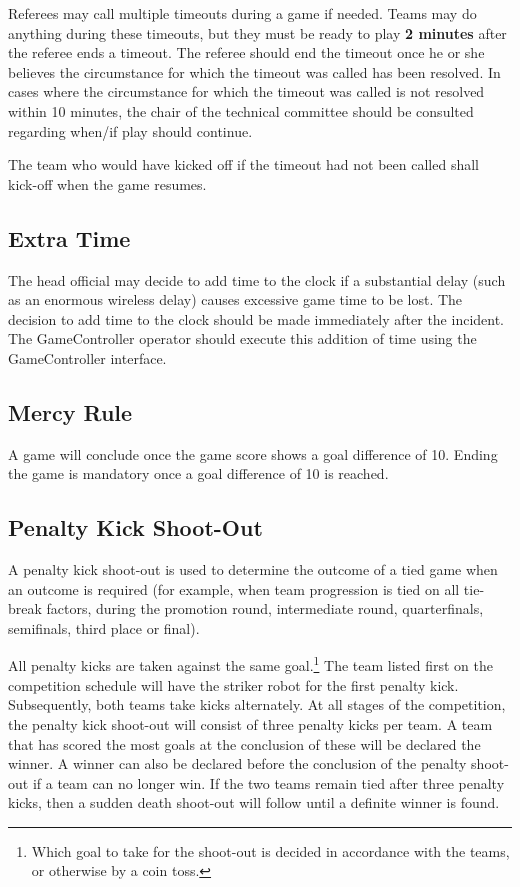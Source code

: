 Referees may call multiple timeouts during a game if needed.
Teams may do anything during these timeouts, but they must be ready to play \textbf{2 minutes} after the referee ends a timeout.
The referee should end the timeout once he or she believes the circumstance for which the timeout was called has been resolved.
In cases where the circumstance for which the timeout was called is not resolved within 10 minutes, the chair of the technical committee should be consulted regarding when/if play should continue.

The team who would have kicked off if the timeout had not been called shall kick-off when the game resumes.

\subsection{Extra Time}
\label{sec:extra_time}

The head official may decide to add time to the clock if a substantial delay (such as an enormous wireless delay) causes excessive game time to be lost.
The decision to add time to the clock should be made immediately after the incident.
The GameController operator should execute this addition of time using the GameController interface.

\subsection{Mercy Rule}
\label{sec:mercy_rule}

A game will conclude once the game score shows a goal difference of 10.
Ending the game is mandatory once a goal difference of 10 is reached.

\subsection{Penalty Kick Shoot-Out}
\label{sec:penalty_shoot-out}

A penalty kick shoot-out is used to determine the outcome of a tied game when an outcome is required (for example, when team progression is tied on all tie-break factors, during the promotion round, intermediate round, quarterfinals, semifinals, third place or final).

All penalty kicks are taken against the same goal.\footnote{
  Which goal to take for the shoot-out is decided in accordance with the teams, or otherwise by a coin toss.
}
The team listed first on the competition schedule will have the striker robot for the first penalty kick.
Subsequently, both teams take kicks alternately.
At all stages of the competition, the penalty kick shoot-out will consist of three penalty kicks per team.
A team that has scored the most goals at the conclusion of these will be declared the winner.
A winner can also be declared before the conclusion of the penalty shoot-out if a team can no longer win.
If the two teams remain tied after three penalty kicks, then a sudden death shoot-out will follow until a definite winner is found.

